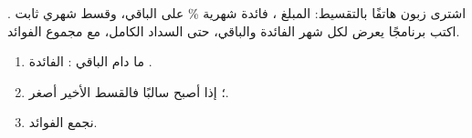 \begin{statement}
اشترى زبون هاتفًا بالتقسيط: المبلغ ، فائدة شهرية \% على الباقي، وقسط شهري ثابت . اكتب برنامجًا يعرض لكل شهر الفائدة والباقي، حتى السداد الكامل، مع مجموع الفوائد.
\end{statement}
\begin{stepsbox}\begin{enumerate}
\item ما دام الباقي : الفائدة .
\item {}؛ إذا أصبح سالبًا فالقسط الأخير أصغر.
\item نجمع الفوائد.
\end{enumerate}\end{stepsbox}
